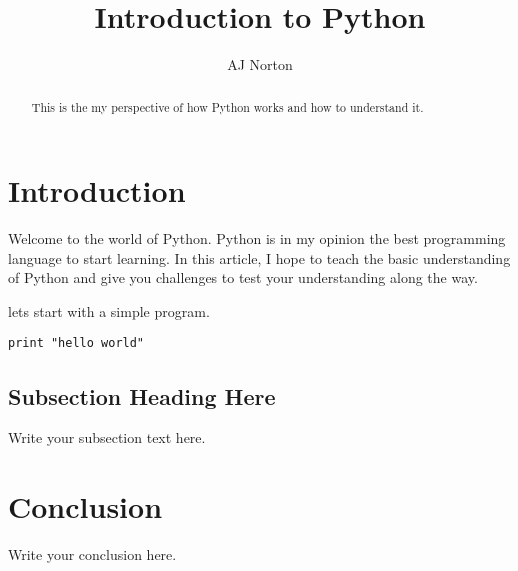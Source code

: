 \documentclass{article}
\begin{document}
\lstset{language=Python}          %

\title{Introduction to Python}
\author{AJ Norton}

\maketitle

\begin{abstract}
This is the my perspective of how Python works and how to understand it.
\end{abstract}

\section{Introduction}
Welcome to the world of Python.  Python is in my opinion the best programming language to start learning.  In this article, I hope to teach the basic understanding of Python and give you challenges to test your understanding along the way.



lets start with a simple program.

\begin{lstlisting}[frame=single] 
print "hello world"
\end{lstlisting}




\subsection{Subsection Heading Here}
Write your subsection text here.

\section{Conclusion}
Write your conclusion here.
\end{document}

